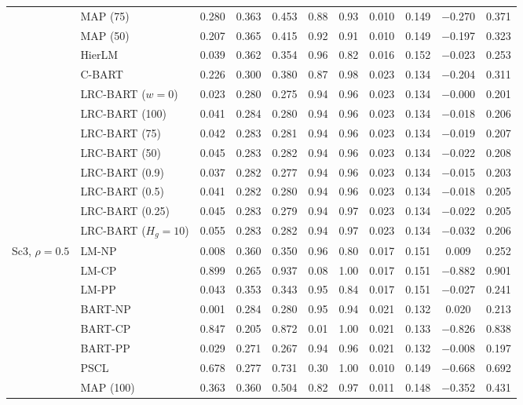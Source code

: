 \documentclass[11pt]{article}
\theoremstyle{definition}
\theoremstyle{plain}
\begin{document}
\begin{center}
\begin{longtable}{llccccccccc}
& MAP (75) & 0.280 & 0.363 & 0.453 & 0.88 & 0.93 & 0.010 & 0.149 & $-$0.270 & 0.371 \\
& MAP (50) & 0.207 & 0.365 & 0.415 & 0.92 & 0.91 & 0.010 & 0.149 & $-$0.197 & 0.323 \\
& HierLM & 0.039 & 0.362 & 0.354 & 0.96 & 0.82 & 0.016 & 0.152 & $-$0.023 & 0.253 \\
& C-BART & 0.226 & 0.300 & 0.380 & 0.87 & 0.98 & 0.023 & 0.134 & $-$0.204 & 0.311 \\
& LRC-BART ($w=0$) & 0.023 & 0.280 & 0.275 & 0.94 & 0.96 & 0.023 & 0.134 & $-$0.000 & 0.201 \\
& LRC-BART (100) & 0.041 & 0.284 & 0.280 & 0.94 & 0.96 & 0.023 & 0.134 & $-$0.018 & 0.206 \\
& LRC-BART (75) & 0.042 & 0.283 & 0.281 & 0.94 & 0.96 & 0.023 & 0.134 & $-$0.019 & 0.207 \\
& LRC-BART (50) & 0.045 & 0.283 & 0.282 & 0.94 & 0.96 & 0.023 & 0.134 & $-$0.022 & 0.208 \\
& LRC-BART (0.9) & 0.037 & 0.282 & 0.277 & 0.94 & 0.96 & 0.023 & 0.134 & $-$0.015 & 0.203 \\
& LRC-BART (0.5) & 0.041 & 0.282 & 0.280 & 0.94 & 0.96 & 0.023 & 0.134 & $-$0.018 & 0.205 \\
& LRC-BART (0.25) & 0.045 & 0.283 & 0.279 & 0.94 & 0.97 & 0.023 & 0.134 & $-$0.022 & 0.205 \\
& LRC-BART ($H_g=10$) & 0.055 & 0.283 & 0.282 & 0.94 & 0.97 & 0.023 & 0.134 & $-$0.032 & 0.206 \\
\midrule
\multirow{20}{*}{Sc3, $\rho=0.5$} & LM-NP & 0.008 & 0.360 & 0.350 & 0.96 & 0.80 & 0.017 & 0.151 & 0.009 & 0.252 \\
& LM-CP & 0.899 & 0.265 & 0.937 & 0.08 & 1.00 & 0.017 & 0.151 & $-$0.882 & 0.901 \\
& LM-PP & 0.043 & 0.353 & 0.343 & 0.95 & 0.84 & 0.017 & 0.151 & $-$0.027 & 0.241 \\
& BART-NP & 0.001 & 0.284 & 0.280 & 0.95 & 0.94 & 0.021 & 0.132 & 0.020 & 0.213 \\
& BART-CP & 0.847 & 0.205 & 0.872 & 0.01 & 1.00 & 0.021 & 0.133 & $-$0.826 & 0.838 \\
& BART-PP & 0.029 & 0.271 & 0.267 & 0.94 & 0.96 & 0.021 & 0.132 & $-$0.008 & 0.197 \\
& PSCL & 0.678 & 0.277 & 0.731 & 0.30 & 1.00 & 0.010 & 0.149 & $-$0.668 & 0.692 \\
& MAP (100) & 0.363 & 0.360 & 0.504 & 0.82 & 0.97 & 0.011 & 0.148 & $-$0.352 & 0.431 \\

\end{longtable}
\end{center}
\end{document}

